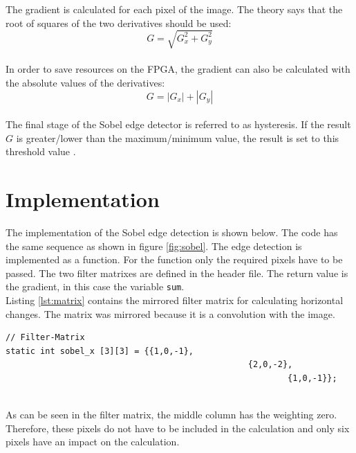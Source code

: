 The gradient is calculated for each pixel of the image. The theory says that the root of squares of the two derivatives should be used:
\begin{equation}
    G = \sqrt{ G_{x}^{2} + G_{y}^{2}}
    \label{eq:g_square_root}
\end{equation}
\\

In order to save resources on the FPGA, the gradient can also be calculated with the absolute values of the derivatives:
\begin{equation}
    G = \left |G_{x}  \right | + \left |G_{y}  \right |
    \label{eq:g_abs}
\end{equation}
\\

The final stage of the Sobel edge detector is referred to as hysteresis. If the result $G$ is greater/lower than the maximum/minimum value, the result is set to this threshold value \cite{sobel_matrix}.


\section{Implementation}
The implementation of the Sobel edge detection is shown below. The code has the same sequence as shown in figure \ref{fig:sobel}. The edge detection is implemented as a function. For the function only the required pixels have to be passed. The two filter matrixes are defined in the header file. The return value is the gradient, in this case the variable \texttt{sum}. \\


Listing \ref{lst:matrix} contains the mirrored filter matrix for calculating horizontal changes. The matrix was mirrored because it is a convolution with the image.

\begin{minipage}{\textwidth}
\begin{lstlisting}[style=CStyle, caption=Filter matrix defined in header, label=lst:matrix]
// Filter-Matrix
static int sobel_x [3][3] = {{1,0,-1},
					  	  	 					 {2,0,-2},
												 		 {1,0,-1}};
\end{lstlisting}
\end{minipage}
\\

As can be seen in the filter matrix, the middle column has the weighting zero. Therefore, these pixels do not have to be included in the calculation and only six pixels have an impact on the calculation.

